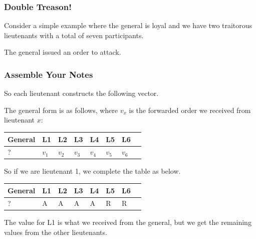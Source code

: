 \begin{frame}
\frametitle{Double Treason!}

Consider a simple example where the general is loyal and we have two traitorous lieutenants with a total of seven participants.

 The general issued an order to attack. 

\begin{center}
\end{center}

\end{frame}

\begin{frame}
\frametitle{Assemble Your Notes}

So each lieutenant constructs the following vector.  

The general form is as follows, where $v_{x}$ is the forwarded order we received from lieutenant $x$:

\begin{center}
\begin{tabular}{|l|l|l|l|l|l|l|l|}
\hline
General & L1 & L2 & L3 & L4 & L5 & L6 \\	
\hline
? & $v_{1}$ & $v_{2}$ & $v_{3}$ & $v_{4}$ & $v_{5}$ & $v_{6}$ \\
\hline
\end{tabular}
\end{center}

So if we are lieutenant 1, we complete the table as below. 
\begin{center}
\begin{tabular}{|l|l|l|l|l|l|l|l|}
\hline
General & L1 & L2 & L3 & L4 & L5 & L6  \\	
\hline
? & A & A & A & A & R & R \\
\hline
\end{tabular}
\end{center}

The value for L1 is what we received from the general, but we get the remaining values from the other lieutenants.

\end{frame}

